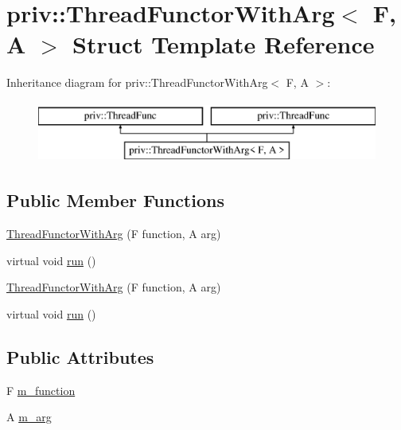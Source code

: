 \hypertarget{structpriv_1_1_thread_functor_with_arg}{\section{priv\-:\-:Thread\-Functor\-With\-Arg$<$ F, A $>$ Struct Template Reference}
\label{structpriv_1_1_thread_functor_with_arg}
}
Inheritance diagram for priv\-:\-:Thread\-Functor\-With\-Arg$<$ F, A $>$\-:\begin{figure}[H]
\begin{center}
\leavevmode
\includegraphics[height=2.000000cm]{structpriv_1_1_thread_functor_with_arg}
\end{center}
\end{figure}
\subsection*{Public Member Functions}
\begin{DoxyCompactItemize}
\item 
\hyperlink{structpriv_1_1_thread_functor_with_arg_ae3745753b77880cdfda6f10d72748efa}{Thread\-Functor\-With\-Arg} (F function, A arg)
\item 
virtual void \hyperlink{structpriv_1_1_thread_functor_with_arg_a0f8bb6ba36819e80016528bab8b0bd4f}{run} ()
\item 
\hyperlink{structpriv_1_1_thread_functor_with_arg_ae3745753b77880cdfda6f10d72748efa}{Thread\-Functor\-With\-Arg} (F function, A arg)
\item 
virtual void \hyperlink{structpriv_1_1_thread_functor_with_arg_a0f8bb6ba36819e80016528bab8b0bd4f}{run} ()
\end{DoxyCompactItemize}
\subsection*{Public Attributes}
\begin{DoxyCompactItemize}
\item 
F \hyperlink{structpriv_1_1_thread_functor_with_arg_ab12992af3112f15df4b6f0dbce3137b9}{m\-\_\-function}
\item 
A \hyperlink{structpriv_1_1_thread_functor_with_arg_ac598f7701f976320bc3964733b9ae9ae}{m\-\_\-arg}
\end{DoxyCompactItemize}


